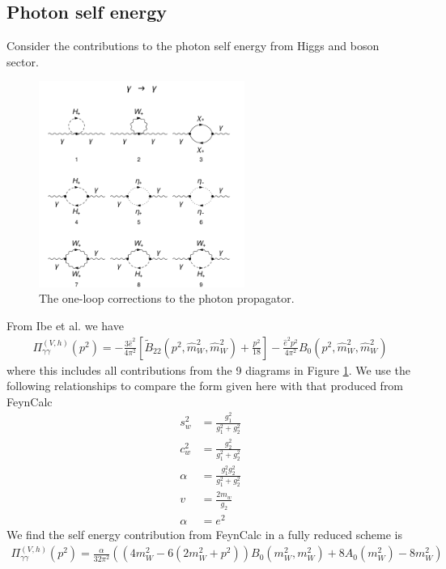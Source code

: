\documentclass[11pt]{article}
\begin{document}
\subsection{Photon self energy}

Consider the contributions to the photon self energy from Higgs and boson sector. 

\begin{figure}[h!]
\center
\includegraphics[width=0.6\textwidth]{diagrams_V[1]_1.pdf}
\caption{The one-loop corrections to the photon propagator.}\label{fig:gammagamma}
\end{figure}

From Ibe et al. we have
\begin{align}
\Pi_{\gamma \gamma}^{(V, h)}(p^2) =
-\frac{3 \hat{e}^2}{4\pi^2}
\left[ \tilde{B}_{22}(p^2, \hat{m}_W^2, \hat{m}_W^2) + \frac{p^2}{18} \right]
-\frac{\hat{e}^2 p^2}{4\pi^2} B_0(p^2, \hat{m}_W^2, \hat{m}_W^2)
\end{align}
where this includes all contributions from the 9 diagrams in Figure \ref{fig:gammagamma}.  We use the following relationships to compare the form given here with that produced from FeynCalc
\begin{align}
s_w^2&=\frac{g_1^2}{g_1^2+g_2^2}\\
c_w^2&=\frac{g_2^2}{g_1^2+g_2^2}\\
\alpha&=\frac{g_1^2g_2^2}{g_1^2+g_2^2}\\
v&=\frac{2m_w}{g_2}\\
\alpha&=e^2
\end{align}
We find the self energy contribution from FeynCalc in a fully reduced scheme is
\begin{align}
\Pi_{\gamma \gamma}^{(V, h)}(p^2) = \frac{\alpha}{32\pi^2} \left( \left(4m_W^2-6(2m_W^2+p^2)\right)B_0(m_W^2,m_W^2)+8 A_0(m_W^2)-8m_W^2\right)
\end{align}
\end{document}
